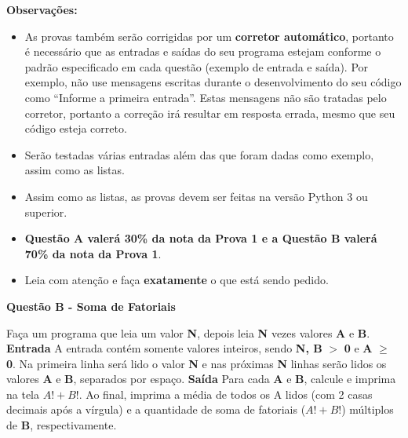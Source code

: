 \documentclass[a4paper, 12pt]{article}
\begin{document}
\textbf{{\large Observações:}}
\begin{itemize}
	\item As provas também serão corrigidas por um \textbf{corretor automático}, portanto é necessário que as entradas e saídas do seu programa estejam conforme o padrão especificado em cada questão (exemplo de entrada e saída). Por exemplo, não use mensagens escritas durante o desenvolvimento do seu código como “Informe a primeira entrada”. Estas mensagens não são tratadas pelo corretor, portanto a correção irá resultar em resposta errada, mesmo que seu código esteja correto.
	\item Serão testadas várias entradas além das que foram dadas como exemplo, assim como as listas.
	\item Assim como as listas, as provas devem ser feitas na versão Python 3 ou superior.
	\item \textbf{Questão A valerá 30\% da nota da Prova 1 e a Questão B valerá 70\% da nota da Prova 1}.
	\item Leia com atenção e faça \textbf{exatamente} o que está sendo pedido.
\end{itemize}
\newpage %
\begin{center}
\textbf{{\Large Questão B - Soma de Fatoriais}}
\end{center}
\vspace{5pt}
Faça um programa que leia um valor \textbf{N}, depois leia \textbf{N} vezes valores \textbf{A} e \textbf{B}. 
\newline \newline
\textbf{{\large Entrada}} \newline
A entrada contém somente valores inteiros, sendo \textbf{N, B} $>$ \textbf{0} e \textbf{A} $\geq$ \textbf{0}. Na primeira linha será lido o valor \textbf{N} e nas próximas \textbf{N} linhas serão lidos os valores \textbf{A} e \textbf{B}, separados por espaço.
\newline \newline
\textbf{{\large Saída}} \newline
Para cada \textbf{A} e \textbf{B}, calcule e imprima na tela $A! + B!$. Ao final, imprima a média de todos os A lidos (com 2 casas decimais após a vírgula) e a quantidade de soma de fatoriais ($A! + B!$) múltiplos de \textbf{B}, respectivamente.
\newline
\end{document}
